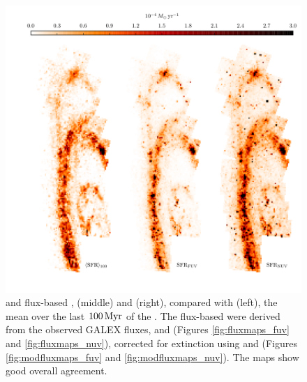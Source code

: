 \documentclass[iop, tighten]{emulateapj}
\begin{document}
\begin{figure}
\centering
\includegraphics[width=\textwidth]{m31flux-figures/sfrmaps1.pdf}
\caption[\sfr{} maps from estimates based on observed fluxes compared with the
mean \sfr{} map from the .]{\fuv{} and \nuv{} flux-based ,
    \sfrfuv{} (middle) and \sfrnuv{} (right), compared with \sfroneh{} (left),
    the mean \sfr{} over the last $100\,\mathrm{Myr}$ of the . The flux-based
     were derived from the observed GALEX fluxes, \fuvobs{} and
    \nuvobs{} (Figures \ref{fig:fluxmaps_fuv} and \ref{fig:fluxmaps_nuv}),
    corrected for extinction using \afuv{} and \anuv{} (Figures
    \ref{fig:modfluxmaps_fuv} and \ref{fig:modfluxmaps_nuv}). The \sfr{} maps
    show good overall agreement.
}
\label{fig:sfrmaps1}
\end{figure}
\end{document}
